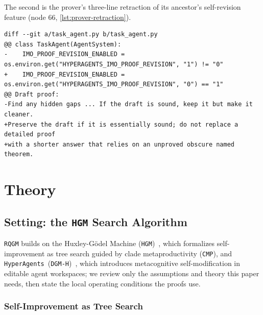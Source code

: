 \documentclass{paper}
\newcommand{\ourmethod}{\texttt{RQGM}\xspace}
\newcommand{\hgm}{\texttt{HGM}\xspace}
\newcommand{\dgmh}{\texttt{DGM-H}\xspace}
\newcommand{\hyperagents}{\texttt{HyperAgents}\xspace}
\newcommand{\cmp}{\texttt{CMP}\xspace}
\begin{document}
The second is the prover's three-line retraction of its ancestor's self-revision feature (node 66, \cref{lst:prover-retraction}).

\begin{lstlisting}[style=rsdiff, caption={Node 66's retraction (proof run): the inherited self-revision pass is disabled by default and the revision instruction is rewritten to preserve sound drafts, on the recorded grounds that revision ``could degrade a correct/near-correct detailed proof into a weaker black-box citation-based proof.''}, label={lst:prover-retraction}]
diff --git a/task_agent.py b/task_agent.py
@@ class TaskAgent(AgentSystem):
-    IMO_PROOF_REVISION_ENABLED = os.environ.get("HYPERAGENTS_IMO_PROOF_REVISION", "1") != "0"
+    IMO_PROOF_REVISION_ENABLED = os.environ.get("HYPERAGENTS_IMO_PROOF_REVISION", "0") == "1"
@@ Draft proof:
-Find any hidden gaps ... If the draft is sound, keep it but make it cleaner.
+Preserve the draft if it is essentially sound; do not replace a detailed proof
+with a shorter answer that relies on an unproved obscure named theorem.
\end{lstlisting}


\section{Theory}
\label{app:proofs}


\subsection{Setting: the \texorpdfstring{\hgm}{HGM} Search Algorithm}
\label{app:prelim}

\ourmethod builds on the Huxley-G\"odel Machine (\hgm)~\citep{wang2025huxley}, which formalizes self-improvement as tree search guided by clade metaproductivity (\cmp), and \hyperagents~(\dgmh)~\citep{zhang2026hyperagents}, which introduces metacognitive self-modification in editable agent workspaces; we review only the assumptions and theory this paper needs, then state the local operating conditions the proofs use.

\subsubsection{Self-Improvement as Tree Search}
\label{sec:prelim:tree}
\end{document}
